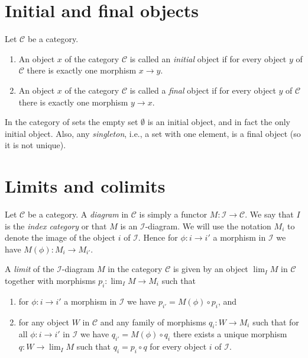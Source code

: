 \section{Initial and final objects}
\label{label-initial-final}

\begin{definition}
\label{definition-initial-final}
Let $\mathcal{C}$ be a category.
\begin{enumerate}
\item An object $x$ of the category $\mathcal{C}$ is called
an {\it initial} object if for every object $y$ of $\mathcal{C}$
there is exactly one morphism $x \to y$.
\item An object $x$ of the category $\mathcal{C}$ is called
a {\it final} object if for every object $y$ of $\mathcal{C}$
there is exactly one morphism $y \to x$.
\end{enumerate}
\end{definition}

\noindent
In the category of sets the empty set $\emptyset$ is an
initial object, and in fact the only initial object.
Also, any {\it singleton}, i.e., a set with one element,
is a final object (so it is not unique).

\section{Limits and colimits}
\label{section-limits}

\noindent
Let $\mathcal{C}$ be a category. A {\it diagram} in $\mathcal{C}$ is
simply a functor $M : \mathcal{I} \to \mathcal{C}$. We say that
$I$ is the {\it index category} or that $M$ is an $\mathcal{I}$-diagram.
We will use the notation $M_i$ to denote the image of the object
$i$ of $\mathcal{I}$. Hence for $\phi : i \to i'$ a morphism
in $\mathcal{I}$ we have $M(\phi) : M_i \to M_{i'}$.

\begin{definition}
\label{definition-limit}
A {\it limit} of the $\mathcal{I}$-diagram $M$ in the category
$\mathcal{C}$ is given by an object $\lim_I M$ in $\mathcal{C}$
together with morphisms $p_i : \lim_I M \to M_i$ such that
\begin{enumerate}
\item for $\phi : i \to i'$ a morphism
in $\mathcal{I}$ we have $p_{i'} =  M(\phi) \circ p_i$, and
\item for any object $W$ in $\mathcal{C}$ and any family of
morphisms $q_i : W \to M_i$ such that for all $\phi : i \to i'$
in $\mathcal{I}$ we have $q_{i'} = M(\phi) \circ q_i$ there 
exists a unique morphism $q : W \to \lim_I M$ such that
$q_i = p_i \circ q$ for every object $i$ of $\mathcal{I}$.
\end{enumerate}
\end{definition}

